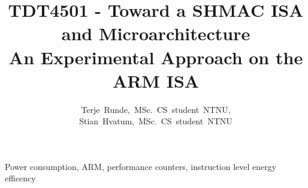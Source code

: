 \documentclass[journal]{IEEEtran}
\begin{document}
\title{\small{TDT4501 - Toward a SHMAC ISA and Microarchitecture}\\\Huge{An Experimental Approach on the ARM ISA}}

\author{Terje~Runde,~MSc.~CS~student~NTNU,
        Stian~Hvatum,~MSc.~CS~student~NTNU}


\maketitle



\begin{IEEEkeywords}
Power consumption, ARM, performance counters, instruction level energy efficency
\end{IEEEkeywords}










\end{document}
